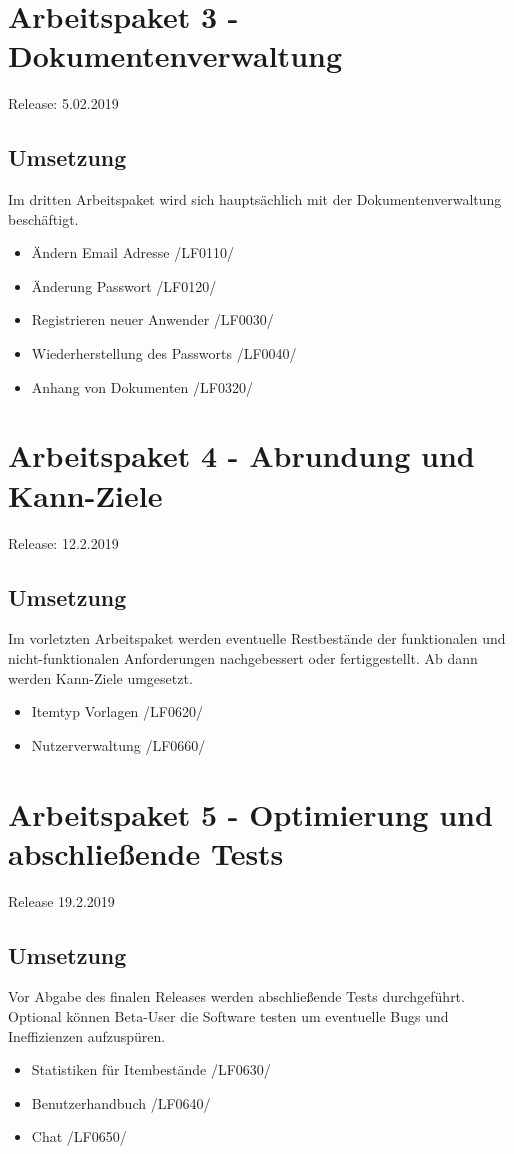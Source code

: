 \documentclass[11pt,a4paper]{report}
\begin{document}
\section{Arbeitspaket 3 - Dokumentenverwaltung}
Release: 5.02.2019
\subsection{Umsetzung}
Im dritten Arbeitspaket wird sich hauptsächlich mit der Dokumentenverwaltung beschäftigt.

\begin{itemize}
\item Ändern Email Adresse /LF0110/
\item Änderung Passwort /LF0120/
\item Registrieren neuer Anwender /LF0030/
\item Wiederherstellung des Passworts /LF0040/
\item Anhang von Dokumenten /LF0320/
\end{itemize}


\section{Arbeitspaket 4 - Abrundung und Kann-Ziele }
Release: 12.2.2019
\subsection{Umsetzung}
Im vorletzten Arbeitspaket werden eventuelle Restbestände der funktionalen und nicht-funktionalen Anforderungen nachgebessert oder fertiggestellt. Ab dann werden Kann-Ziele umgesetzt.
\begin{itemize}
\item Itemtyp Vorlagen /LF0620/
\item Nutzerverwaltung /LF0660/
\end{itemize}

\section{Arbeitspaket 5 - Optimierung und abschließende Tests}
Release 19.2.2019
\subsection{Umsetzung}
Vor Abgabe des finalen Releases werden abschließende Tests durchgeführt. Optional können Beta-User die Software testen um eventuelle Bugs und Ineffizienzen aufzuspüren.
\begin{itemize}
\item Statistiken für Itembestände /LF0630/
\item Benutzerhandbuch /LF0640/
\item Chat /LF0650/
\end{itemize}
\end{document}
